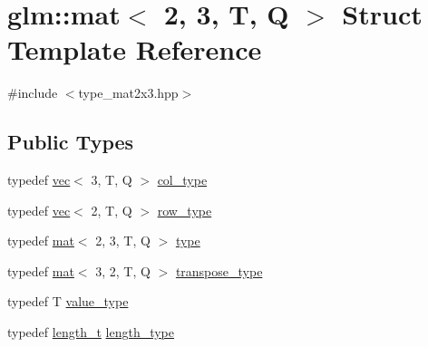 \hypertarget{structglm_1_1mat_3_012_00_013_00_01_t_00_01_q_01_4}{}\section{glm\+:\+:mat$<$ 2, 3, T, Q $>$ Struct Template Reference}
\label{structglm_1_1mat_3_012_00_013_00_01_t_00_01_q_01_4}


{\ttfamily \#include $<$type\+\_\+mat2x3.\+hpp$>$}

\subsection*{Public Types}
\begin{DoxyCompactItemize}
\item 
typedef \hyperlink{structglm_1_1vec}{vec}$<$ 3, T, Q $>$ \hyperlink{structglm_1_1mat_3_012_00_013_00_01_t_00_01_q_01_4_aebe4faf14ea1bc3092b4bbf591d7194e}{col\+\_\+type}
\item 
typedef \hyperlink{structglm_1_1vec}{vec}$<$ 2, T, Q $>$ \hyperlink{structglm_1_1mat_3_012_00_013_00_01_t_00_01_q_01_4_a94cb8478500cfb7249eadf766b9e64f1}{row\+\_\+type}
\item 
typedef \hyperlink{structglm_1_1mat}{mat}$<$ 2, 3, T, Q $>$ \hyperlink{structglm_1_1mat_3_012_00_013_00_01_t_00_01_q_01_4_a8a283bdf36e731e243e185a5dc783070}{type}
\item 
typedef \hyperlink{structglm_1_1mat}{mat}$<$ 3, 2, T, Q $>$ \hyperlink{structglm_1_1mat_3_012_00_013_00_01_t_00_01_q_01_4_a5e827ce80d430334f2815fa8eb6aeb06}{transpose\+\_\+type}
\item 
typedef T \hyperlink{structglm_1_1mat_3_012_00_013_00_01_t_00_01_q_01_4_a16f6111e5e9f3d29da5926277e63f668}{value\+\_\+type}
\item 
typedef \hyperlink{namespaceglm_a090a0de2260835bee80e71a702492ed9}{length\+\_\+t} \hyperlink{structglm_1_1mat_3_012_00_013_00_01_t_00_01_q_01_4_ad2e2433ba375abcd6bada873f8ea2de1}{length\+\_\+type}
\end{DoxyCompactItemize}
